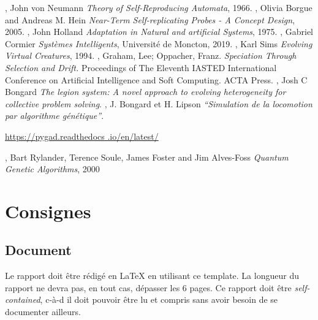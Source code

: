 \documentclass[journal, a4paper]{IEEEtran}
\begin{document}
%
%
%
\begin{thebibliography}{99}
	 , John von Neumann
	\textit{Theory of Self-Reproducing Automata}, 1966.
	 , Olivia Borgue and Andreas M.
	Hein \textit{Near-Term Self-replicating Probes - A Concept Design}, 2005.
	 , John Holland \textit{Adaptation in
	Natural
	and artificial Systems}, 1975.
	 , Gabriel Cormier \textit{Systèmes Intelligents}, Université de Moncton, 2019.
	 , Karl Sims \textit{Evolving Virtual Creatures}, 1994.
	 , Graham, Lee; Oppacher, Franz. \textit{
	Speciation Through Selection and Drift. } Proceedings of The Eleventh IASTED International Conference on Artificial Intelligence and Soft Computing. ACTA Press.
	 , Josh C Bongard \textit{The legion
	system: A novel approach to evolving heterogeneity for collective problem solving}.
	 , J. Bongard et H. Lipson \textit{“Simulation de la locomotion par algorithme génétique”}.

	 \url{https://pygad.readthedocs
	.io/en/latest/}

	 , Bart Rylander, Terence Soule,
	James Foster and Jim Alves-Foss \textit{Quantum Genetic Algorithms}, 2000
\end{thebibliography}


\newpage

\appendices
\section{Consignes}\label{sec:consignes}
\subsection*{Document}
	Le rapport doit être rédigé en \LaTeX{} en utilisant ce template.
	La longueur du rapport ne devra pas, en tout cas, dépasser les 6 pages.
	Ce rapport doit être \emph{self-contained}, c-à-d il doit pouvoir être lu et compris sans avoir besoin de se documenter ailleurs.



\end{document}
